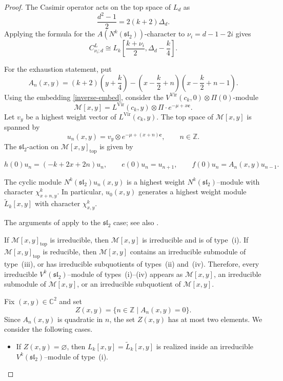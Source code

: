 \documentclass[11 pt]{amsart}
\theoremstyle{definition}
\theoremstyle{plain}
\newcommand{\Vir}{\mathrm{Vir}}
\begin{document}
\begin{proof}
The Casimir operator acts on the top space of $L_d$ as
\[
\frac{d^2-1}{2}=2(k+2)\Delta_d.
\]
Applying the formula for the $A(N^k(\mathfrak{sl}_2))$-character to
$\nu_i=d-1-2i$ gives
\[
C^L_{\nu_i;d}
\cong
L_k\left[
\frac{k+\nu_i}{2},
\Delta_d-\frac{k}{4}
\right].
\]

For the exhaustion statement, put
\[
A_n(x,y)=
(k+2)\left(y+\frac{k}{4}\right)-
\left(x-\frac{k}{2}+n\right)
\left(x-\frac{k}{2}+n-1\right).
\]
Using the embedding \eqref{inverse-embed}, consider the
$V^{\Vir}(c_k,0)\otimes\Pi(0)$-module
\[
\mathcal M[x,y]
=L^{\Vir}(c_k,y)\otimes\Pi\cdot e^{-\mu+x\mathbf c}.
\]
Let $v_y$ be a highest weight vector of $L^{\Vir}(c_k,y)$. The top
space of $\mathcal M[x,y]$ is spanned by
\[
u_n(x,y)=v_y\otimes e^{-\mu+(x+n)\mathbf c},\qquad n\in\mathbb Z.
\]
The $\mathfrak{sl}_2$-action on
$\mathcal M[x,y]_{\mathrm{top}}$ is given by

\begin{equation}
h(0)u_n=(-k+2x+2n)u_n,\qquad
e(0)u_n=u_{n+1},\qquad
f(0)u_n=A_n(x,y)u_{n-1}.
\label{top-space}
\end{equation}

The cyclic module $N^k(\mathfrak{sl}_2)u_n(x,y)$ is a highest weight
$N^k(\mathfrak{sl}_2)$--module with character $\chi^k_{x+n,y}$. In
particular, $u_0(x,y)$ generates a highest weight module
$\widetilde L_k[x,y]$ with character $\chi^k_{x,y}$.

The arguments of \cite[Sections~3.3 and~3.4]{AKR24} apply to the
$\mathfrak{sl}_2$ case; see also \cite[Section~1.2]{AKR24}.

If $\mathcal M[x,y]_{\mathrm{top}}$ is
irreducible, then $\mathcal M[x,y]$ is irreducible and is of
type~\textup{(i)}. If $\mathcal M[x,y]_{\mathrm{top}}$ is reducible,
then $\mathcal M[x,y]$ contains an irreducible submodule of
type~\textup{(iii)}, or has irreducible subquotients of
types~\textup{(ii)} and~\textup{(iv)}. Therefore, every irreducible
$V^k(\mathfrak{sl}_2)$--module of types~\textup{(i)--(iv)} appears as
$\mathcal M[x,y]$, an irreducible submodule of $\mathcal M[x,y]$, or
an irreducible subquotient of $\mathcal M[x,y]$.

Fix $(x,y)\in\mathbb C^2$ and set
\[
Z(x,y)=\{n\in\mathbb Z\mid A_n(x,y)=0\}.
\]
Since $A_n(x,y)$ is quadratic in $n$, the set $Z(x,y)$ has at most two
elements. We consider the following cases.
\begin{itemize}
\item If $Z(x,y)=\varnothing$, then
$L_k[x,y]=\widetilde L_k[x,y]$ is realized inside an irreducible
$V^k(\mathfrak{sl}_2)$--module of type~\textup{(i)}.


\end{itemize}
\end{proof}
\end{document}
